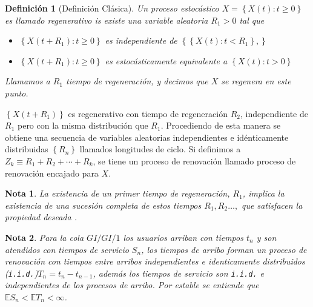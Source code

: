 \documentclass{article}
\newtheorem{Def}{Definición}
\newtheorem{Note}{Nota}
\newcommand{\esp}{\mathbb{E}}
\begin{document}


\begin{Def}[Definici\'on Cl\'asica]
Un proceso estoc\'astico $X=\left\{X\left(t\right):t\geq0\right\}$ es llamado regenerativo is existe una variable aleatoria $R_{1}>0$ tal que
\begin{itemize}
\item[i)] $\left\{X\left(t+R_{1}\right):t\geq0\right\}$ es independiente de $\left\{\left\{X\left(t\right):t<R_{1}\right\},\right\}$
\item[ii)] $\left\{X\left(t+R_{1}\right):t\geq0\right\}$ es estoc\'asticamente equivalente a $\left\{X\left(t\right):t>0\right\}$
\end{itemize}

Llamamos a $R_{1}$ tiempo de regeneraci\'on, y decimos que $X$ se regenera en este punto.
\end{Def}

$\left\{X\left(t+R_{1}\right)\right\}$ es regenerativo con tiempo de regeneraci\'on $R_{2}$, independiente de $R_{1}$ pero con la misma distribuci\'on que $R_{1}$. Procediendo de esta manera se obtiene una secuencia de variables aleatorias independientes e id\'enticamente distribuidas $\left\{R_{n}\right\}$ llamados longitudes de ciclo. Si definimos a $Z_{k}\equiv R_{1}+R_{2}+\cdots+R_{k}$, se tiene un proceso de renovaci\'on llamado proceso de renovaci\'on encajado para $X$.


\begin{Note}
La existencia de un primer tiempo de regeneraci\'on, $R_{1}$, implica la existencia de una sucesi\'on completa de estos tiempos $R_{1},R_{2}\ldots,$ que satisfacen la propiedad deseada \cite{Sigman2}.
\end{Note}


\begin{Note} Para la cola $GI/GI/1$ los usuarios arriban con tiempos $t_{n}$ y son atendidos con tiempos de servicio $S_{n}$, los tiempos de arribo forman un proceso de renovaci\'on  con tiempos entre arribos independientes e identicamente distribuidos (\texttt{i.i.d.})$T_{n}=t_{n}-t_{n-1}$, adem\'as los tiempos de servicio son \texttt{i.i.d.} e independientes de los procesos de arribo. Por \textit{estable} se entiende que $\esp S_{n}<\esp T_{n}<\infty$.
\end{Note}
 
\end{document}

